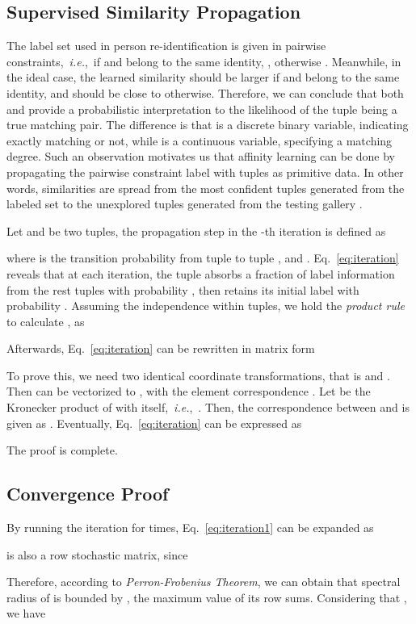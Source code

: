 \documentclass[10pt,twocolumn,letterpaper]{article}
\def\ie{\emph{i.e.}}
\begin{document}
\subsection{Supervised Similarity Propagation}
The label set  used in person re-identification is given in pairwise constraints,~\ie,~if  and  belong to the same identity, , otherwise . Meanwhile, in the ideal case, the learned similarity  should be larger if  and  belong to the same identity, and  should be close to  otherwise. Therefore, we can conclude that both  and  provide a probabilistic interpretation to the likelihood of the tuple  being a true matching pair. The difference is that  is a discrete binary variable, indicating exactly matching or not, while  is a continuous variable, specifying a matching degree. Such an observation motivates us that affinity learning can be done by propagating the pairwise constraint label  with tuples as primitive data. In other words, similarities are spread from the most confident tuples generated from the labeled set  to the unexplored tuples generated from the testing gallery .

Let  and  be two tuples, the propagation step in the -th iteration is defined as

where  is the transition probability from tuple  to tuple , and . Eq.~\eqref{eq:iteration} reveals that at each iteration, the tuple  absorbs a fraction of label information from the rest tuples with probability , then retains its initial label  with probability .
Assuming the independence within tuples, we hold the \emph{product rule} to calculate , as

Afterwards, Eq.~\eqref{eq:iteration} can be rewritten in matrix form


To prove this, we need two identical coordinate transformations, that is  and .
Then  can be vectorized to , with the element correspondence . Let  be the Kronecker product of  with itself,~\ie,~. Then, the correspondence between  and  is given as . Eventually, Eq.~\eqref{eq:iteration} can be expressed as

The proof is complete.

\subsection{Convergence Proof}
By running the iteration for  times, Eq.~\eqref{eq:iteration1} can be expanded as

 is also a row stochastic matrix, since

Therefore, according to \emph{Perron-Frobenius Theorem}, we can obtain that spectral radius of  is bounded by , the maximum value of its row sums. Considering that , we have
\end{document}
